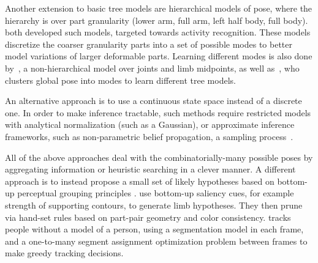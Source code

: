 Another extension to basic tree models are hierarchical models of pose, where 
the hierarchy is over part granularity (\eg lower arm, full arm, left half 
body, full body). \citet{wang2011,sun2011} both developed such models, targeted 
towards activity recognition.  These models discretize the coarser granularity 
parts into a set of possible modes to better model variations of larger 
deformable parts.  Learning different modes is also done by~\citet{deva2011}, a 
non-hierarchical model over joints and limb midpoints, as well 
as~\citet{everingham2011}, who clusters global pose into modes to learn 
different tree models.

An alternative approach is to use a continuous state space instead of a 
discrete one.  In order to make inference tractable, such methods require 
restricted models with analytical normalization (such as a Gaussian), or 
approximate inference frameworks, such as non-parametric belief propagation, a 
sampling process~\citep{sigal-thesis}.  

All of the above approaches deal with the combinatorially-many possible poses 
by aggregating information or heuristic searching in a clever manner.  A 
different approach is to instead propose a small set of likely hypotheses based 
on bottom-up perceptual grouping principles \citep{mori04,praveen07}.  
\citet{mori04} use bottom-up saliency cues, for example strength of supporting 
contours, to generate limb hypotheses. They then prune via hand-set rules based 
on part-pair geometry and color consistency.  \citet{ren07} tracks people 
without a model of a person, using a segmentation model in each frame, and a 
one-to-many segment assignment optimization problem between frames to make 
greedy tracking decisions.
